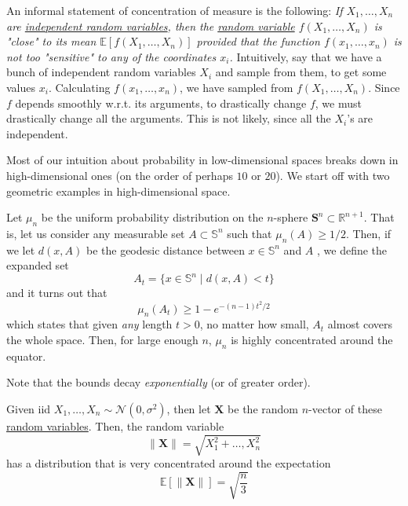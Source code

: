 An informal statement of concentration of measure is the following: \textit{If $X_1, \ldots, X_n$ are \hyperref[prob-def:independent-random-variables]{independent random variables}, then the \hyperref[prob-def:random-variable]{random variable} $f(X_1, \ldots, X_n)$ is "close" to its mean $\mathbb{E}[f(X_1, \ldots, X_n)]$ provided that the function $f(x_1, \ldots, x_n)$ is not too "sensitive" to any of the coordinates $x_i$.} Intuitively, say that we have a bunch of independent random variables $X_i$ and sample from them, to get some values $x_i$. Calculating $f(x_1, \ldots, x_n)$, we have sampled from $f(X_1, \ldots, X_n)$. Since $f$ depends smoothly w.r.t. its arguments, to drastically change $f$, we must drastically change all the arguments. This is not likely, since all the $X_i$'s are independent. 

Most of our intuition about probability in low-dimensional spaces breaks down in high-dimensional ones (on the order of perhaps $10$ or $20$). We start off with two geometric examples in high-dimensional space. 

\begin{example}
  \label{ex:uniform-measure-on-sphere}
Let $\mu_n$ be the uniform probability distribution on the $n$-sphere $\mathbf{S}^{n} \subset \mathbb{R}^{n+1}$. That is, let us consider any measurable set $A \subset \mathbb{S}^{n}$ such that $\mu_n (A) \geq 1/2$. Then, if we let $d(x, A)$ be the geodesic distance between $x \in \mathbb{S}^n$ and $A$ , we define the expanded set 
\begin{equation}
  A_t = \{x \in \mathbb{S}^n \mid d(x, A) < t\}
\end{equation}
and it turns out that 
\begin{equation}
  \mu_n (A_t) \geq 1 - e^{- (n -1) t^2 / 2}
\end{equation}
which states that given \textit{any} length $t > 0$, no matter how small, $A_t$ almost covers the whole space. Then, for large enough $n$, $\mu_n$ is highly concentrated around the equator. 
\end{example}

Note that the bounds decay \textit{exponentially} (or of greater order). 

\begin{example}
  \label{ex:uniform-measure-on-cube}

\end{example}

\begin{example}
  \label{ex:high-dimensional-gaussian}
Given iid $X_1, \ldots, X_n \sim \mathcal{N}(0, \sigma^2)$, then let $\mathbf{X}$ be the random $n$-vector of these \hyperref[prob-def:random-variable]{random variables}. Then, the random variable 
\begin{equation}
  \|\mathbf{X}\| = \sqrt{X_1^2 + \ldots, X_n^2}
\end{equation}
has a distribution that is very concentrated around the expectation 
\begin{equation}
  \mathbb{E}[\|\mathbf{X}\|] = \sqrt{\frac{n}{3}}
\end{equation}
\end{example}

